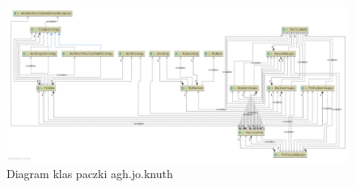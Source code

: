 \renewcommand\thesection{\Alph{section}}
\renewcommand\thefigure{\thesection.\arabic{figure}}
\setcounter{section}{1}
\setcounter{figure}{0}
\begin{figure}
		\centering
		\caption{Diagram klas paczki agh.jo.knuth}\label{fig:classDiagram}
		\includegraphics[angle=90,height = 0.95\textheight]{Class_Diagram_white.png}
\end{figure}